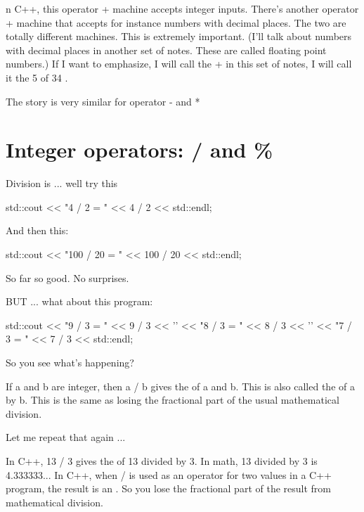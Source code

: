 n C++, this operator + machine accepts integer inputs. There's another
operator + machine that accepts for instance numbers with decimal
places. The two are totally different machines. This is extremely
important. (I'll talk about numbers with decimal places in another set of
notes. These are called floating point numbers.) If I want to emphasize, I
will call the + in this set of notes, I will call it the
5 of 34 .

The story is very similar for operator - and *

%

%

\newpage\section{Integer operators: / and \%}

Division is ... well try this
\begin{console}
std::cout << "4 / 2 = " << 4 / 2 << std::endl;
\end{console}

And then this:
\begin{console}
std::cout << "100 / 20 = " << 100 / 20 << std::endl;
\end{console}

So far so good. No surprises.

BUT ... what about this program:
\begin{console}
std::cout << "9 / 3 = " << 9 / 3 << '\n'
          << "8 / 3 = " << 8 / 3 << '\n'
          << "7 / 3 = " << 7 / 3 << std::endl;
\end{console}
So you see what's happening?

If a and b are integer, then a / b gives the  of a and b. This
is also called the  of a by b. This is the same
as losing the fractional part of the usual mathematical division.

Let me repeat that again ...

In C++, 13 / 3 gives the  of 13 divided by 3. In math, 13 divided by 3 is 4.333333... In C++, when / is used as an
operator for two  values in a C++ program, the result is an
. So you lose the fractional part of the result from
mathematical division.

%

